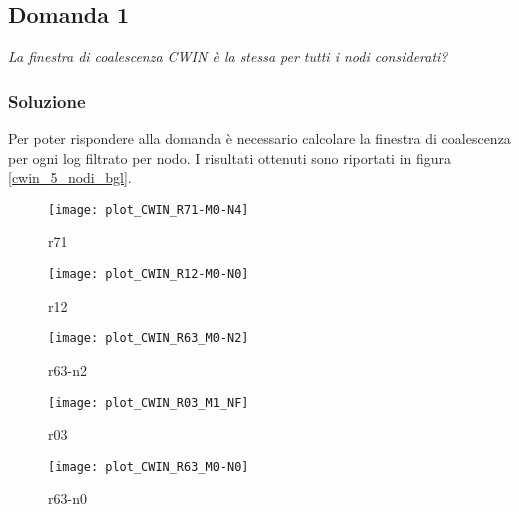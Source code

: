 \clearpage

\subsection{Domanda 1}
\textit{La finestra di coalescenza CWIN è la stessa per tutti i nodi considerati?}

\subsubsection*{Soluzione}
Per poter rispondere alla domanda è necessario calcolare la finestra di coalescenza
per ogni log filtrato per nodo.
I risultati ottenuti sono riportati in figura \ref{cwin_5_nodi_bgl}.\\

\begin{minipage}{\linewidth}
  \centering
  \begin{minipage}{0.49\linewidth}
    \begin{figure}[H]
      \texttt{[image: plot\_CWIN\_R71-M0-N4]}
      \caption*{r71}
    \end{figure}
  \end{minipage}
  \begin{minipage}{0.49\linewidth}
    \begin{figure}[H]
      \texttt{[image: plot\_CWIN\_R12-M0-N0]}
      \caption*{r12}
    \end{figure}
  \end{minipage}
  \begin{minipage}{0.49\linewidth}
    \begin{figure}[H]
      \texttt{[image: plot\_CWIN\_R63\_M0-N2]}
      \caption*{r63-n2}
    \end{figure}
  \end{minipage}
  \begin{minipage}{0.49\linewidth}
    \begin{figure}[H]
      \centering
      \texttt{[image: plot\_CWIN\_R03\_M1\_NF]}
      \caption*{r03}
    \end{figure}
  \end{minipage}
  \begin{minipage}{0.49\linewidth}
    \hspace{0.25\linewidth}
    \begin{figure}[H]
      \texttt{[image: plot\_CWIN\_R63\_M0-N0]}
      \caption*{r63-n0}
    \end{figure}
  \end{minipage}
\end{minipage}
\label{cwin_5_nodi_bgl}

